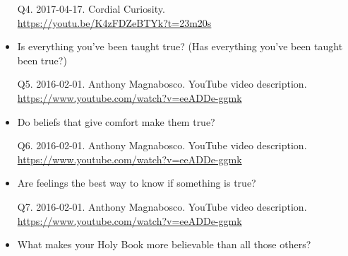 \documentclass[a4paper]{scrartcl}
\begin{document}
\begin{itemize}
                \begin{tiny}
                    Q4.
                    2017-04-17.
                    Cordial Curiosity.
                        \\
                        \url{ https://youtu.be/K4zFDZeBTYk?t=23m20s }
                    \par
                \end{tiny}
                    \item Is everything you've been taught true? (Has everything you've been taught been true?)
                    
                \begin{tiny}
                    Q5.
                    2016-02-01.
                    Anthony Magnabosco.
                        YouTube video description.
                        \\
                        \url{ https://www.youtube.com/watch?v=eeADDe-ggmk }
                    \par
                \end{tiny}
                    \item Do beliefs that give comfort make them true?
                    
                \begin{tiny}
                    Q6.
                    2016-02-01.
                    Anthony Magnabosco.
                        YouTube video description.
                        \\
                        \url{ https://www.youtube.com/watch?v=eeADDe-ggmk }
                    \par
                \end{tiny}
                    \item Are feelings the best way to know if something is true?
                    
                \begin{tiny}
                    Q7.
                    2016-02-01.
                    Anthony Magnabosco.
                        YouTube video description.
                        \\
                        \url{ https://www.youtube.com/watch?v=eeADDe-ggmk }
                    \par
                \end{tiny}
                    \item What makes your Holy Book more believable than all those others?
                    

\end{itemize}
\end{document}
